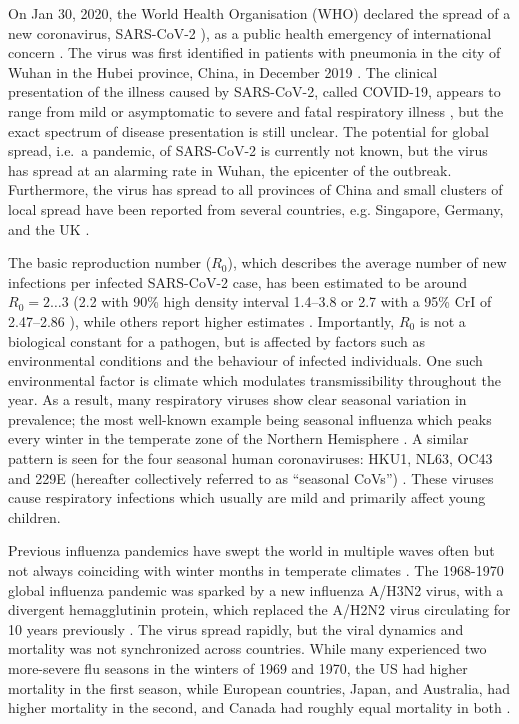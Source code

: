 \documentclass[rmp, reprint, superscriptaddress, floatfix,amsmath]{revtex4-1}
\begin{document}
On Jan 30, 2020, the World Health Organisation (WHO) declared the spread of a new coronavirus, SARS-CoV-2 \citep{ICTV_SARS-CoV-2}), as a public health emergency of international concern \citep{WHO_statement}.
The virus was first identified in patients with pneumonia in the city of Wuhan in the Hubei province, China, in December 2019 \citep{Liangjun2020rna}.
The clinical presentation of the illness caused by SARS-CoV-2, called COVID-19, appears to range from mild or asymptomatic to severe and fatal respiratory illness \citep{WHO_situation_report23}, but the exact spectrum of disease presentation is still unclear. 
The potential for global spread, i.e.~a pandemic, of SARS-CoV-2 is currently not known, but the virus has spread at an alarming rate in Wuhan, the epicenter of the outbreak. Furthermore, the virus has spread to all provinces of China and small clusters of local spread have been reported from several countries, e.g. Singapore, Germany, and the UK \citep{WHO_situation_report23, rothe2020transmission, MOH_Singapore}. 

The basic reproduction number ($R_0$), which describes the average number of new infections per infected SARS-CoV-2 case, has been estimated to be around $R_0 = 2 \ldots 3$ (2.2  with 90\% high density interval 1.4–3.8 \citep{Riou2020pattern} or 2.7 with a 95\% CrI of 2.47–2.86 \citep{wu_nowcasting_2020}), while others report higher estimates \citep{yang_epidemiological_2020}. Importantly, $R_0$ is not a biological constant for a pathogen, but is affected by factors such as environmental conditions and the behaviour of infected individuals. One such environmental factor is climate which modulates transmissibility throughout the year. 
As a result, many respiratory viruses show clear seasonal variation in prevalence; the most well-known example being seasonal influenza which peaks every winter in the temperate zone of the Northern Hemisphere \citep{petrova_evolution_2018}. 
A similar pattern is seen for the four seasonal human coronaviruses: HKU1, NL63, OC43 and 229E (hereafter collectively referred to as ``seasonal CoVs'') \citep{killerby2018human,goes2019typical,galanti2019longitudinal,friedman2018human,al2016diversity,huang2017epidemiology}. 
These viruses cause respiratory infections which usually are mild and primarily affect young children. 
         
Previous influenza pandemics have swept the world in multiple waves often but not always coinciding with winter months in temperate climates \citep{taubenberger_1918_2019,viboud_multinational_2005,viboud_global_2016,amato-gauci_surveillance_2011}. 
The 1968-1970 global influenza pandemic was sparked by a new influenza A/H3N2 virus, with a divergent hemagglutinin protein, which replaced the A/H2N2 virus circulating for 10 years previously \citep{viboud_multinational_2005}. The virus spread rapidly, but the viral dynamics and mortality was not synchronized across countries.
While many experienced two more-severe flu seasons in the winters of 1969 and 1970, the US had higher mortality in the first season, while European countries, Japan, and Australia, had higher mortality in the second, and Canada had roughly equal mortality in both \citep{viboud_multinational_2005}.
\end{document}
